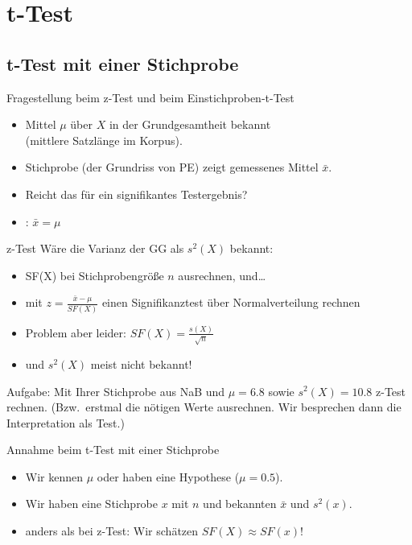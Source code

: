 \section[t-Test]{t-Test}

\subsection{t-Test mit einer Stichprobe}

\begin{frame}
  {Fragestellung beim z-Test und beim Einstichproben-t-Test}
  \begin{itemize}[<+->]
    \item Mittel $\mu$ über $X$ in der Grundgesamtheit bekannt\\
      (\zB mittlere Satzlänge im Korpus).
    \item Stichprobe (\zB der Grundriss von PE) zeigt gemessenes Mittel $\bar{x}$.
    \item Reicht das für ein signifikantes Testergebnis?
    \item \alert{\Null: $\bar{x}=\mu$}
  \end{itemize}
\end{frame}

\begin{frame}
  {z-Test}
    Wäre die \alert{Varianz der GG} als $s^2(X)$ bekannt:\\
    \vspace{0.5cm}
    \begin{itemize}[<+->]
      \item SF(X) bei Stichprobengröße $n$ ausrechnen, und\ldots
      \item mit \alert{$z=\frac{\bar{x}-\mu}{SF(X)}$} einen Signifikanztest über Normalverteilung rechnen
        \vspace{\baselineskip}
      \item Problem aber leider: $SF(X)=\frac{s(X)}{\sqrt{n}}$
      \item und $s^2(X)$ meist nicht bekannt!
    \end{itemize}
    \vspace{\baselineskip}
    Aufgabe: Mit Ihrer Stichprobe aus NaB und $\mu=6.8$ sowie $s^2(X)=10.8$ z-Test rechnen. (Bzw.\ erstmal die nötigen Werte ausrechnen. Wir besprechen dann die Interpretation als Test.)
\end{frame}

\begin{frame}
  {Annahme beim t-Test mit einer Stichprobe}
  \begin{itemize}[<+->]
    \item Wir kennen $\mu$ oder haben eine Hypothese (\zB $\mu=0.5$).
    \item Wir haben eine Stichprobe $x$ mit $n$ und bekannten $\bar{x}$ und $s^2(x)$.
        \vspace{\baselineskip}
    \item anders als bei z-Test: \alert{Wir schätzen $SF(X)\approx SF(x)$!}
  \end{itemize}
\end{frame}


